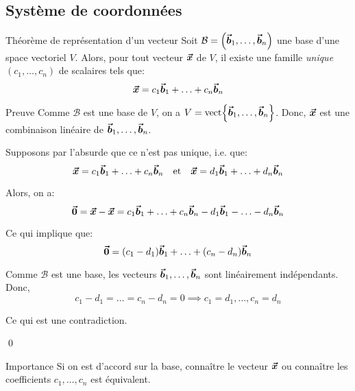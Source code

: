 \documentclass[a4paper]{article}
\begin{document}
\subsection{Système de coordonnées}
\begin{parag}{Théorème de représentation d'un vecteur}
    Soit $\mathcal{B} = \left(\bvec{b}_1, \ldots, \bvec{b}_n\right)$ une base d'une space vectoriel $V$. Alors, pour tout vecteur $\bm{\protect\vec{x}}$ de $V$, il existe une famille \textit{unique} $\left(c_1, \ldots, c_n\right)$ de scalaires tels que:
    \[\bm{\protect\vec{x}} = c_1 \bm{\protect\vec{b}}_1 + \ldots + c_n \bm{\protect\vec{b}}_n\]

    \begin{subparag}{Preuve}
         Comme $\mathcal{B}$ est une base de $V$, on a $V = \vect\left\{\bvec{b}_1, \ldots, \bvec{b}_n\right\}$. Donc, $\bm{\protect\vec{x}}$ est une combinaison linéaire de $\bm{\protect\vec{b}}_1, \ldots, \bm{\protect\vec{b}}_n$.

        \vspace{1em}

         Supposons par l'absurde que ce n'est pas unique, i.e. que:
        \[\bm{\protect\vec{x}} = c_1 \bm{\protect\vec{b}}_1 + \ldots + c_n \bm{\protect\vec{b}}_n \quad \text{et} \quad \bm{\protect\vec{x}} = d_1 \bm{\protect\vec{b}}_1 + \ldots + d_n \bm{\protect\vec{b}}_n\]

        Alors, on a:
        \[\bm{\protect\vec{0}} = \bm{\protect\vec{x}} - \bm{\protect\vec{x}} = c_1 \bm{\protect\vec{b}}_1 + \ldots + c_n \bm{\protect\vec{b}}_n - d_1 \bm{\protect\vec{b}}_1 - \ldots - d_n \bm{\protect\vec{b}}_n\]

        Ce qui implique que:
        \[\bvec{0} = \left(c_1 - d_1\right)\bvec{b}_1 + \ldots + \left(c_n - d_n\right)\bvec{b}_n\]

        Comme $\mathcal{B}$ est une base, les vecteurs $\bm{\protect\vec{b}}_1, \ldots, \bm{\protect\vec{b}}_n$ sont linéairement indépendants. Donc,
        \[c_1 - d_1 = \ldots = c_n - d_n = 0 \implies c_1 = d_1, \ldots, c_n = d_n\]

        Ce qui est une contradiction.

        \qed
    \end{subparag}

    \begin{subparag}{Importance}
        Si on est d'accord sur la base, connaître le vecteur $\bm{\protect\vec{x}}$ ou connaître les coefficients $c_1, \ldots, c_n$ est équivalent.
    \end{subparag}
\end{parag}
\end{document}
